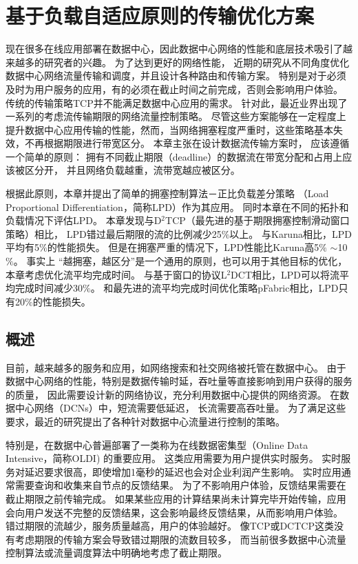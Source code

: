 \chapter{基于负载自适应原则的传输优化方案}
\label{chapter:LPD}
现在很多在线应用部署在数据中心，因此数据中心网络的性能和底层技术吸引了越来越多的研究者的兴趣。
为了达到更好的网络性能，
近期的研究从不同角度优化数据中心网络流量传输和调度，并且设计各种路由和传输方案。
特别是对于必须及时为用户服务的应用，有的必须在截止时间之前完成，否则会影响用户体验。
传统的传输策略TCP并不能满足数据中心应用的需求。
针对此，最近业界出现了一系列的考虑流传输期限的网络流量控制策略。
尽管这些方案能够在一定程度上提升数据中心应用传输的性能，然而，当网络拥塞程度严重时，这些策略基本失效，不再根据期限进行带宽区分。
本章主张在设计数据流传输方案时，
应该遵循一个简单的原则：
拥有不同截止期限（deadline）的数据流在带宽分配和占用上应该被区分开，
并且网络负载越重，流带宽越应被区分。

根据此原则，本章并提出了简单的拥塞控制算法－正比负载差分策略
（Load Proportional Differentiation，简称LPD）作为其应用。
同时本章在不同的拓扑和负载情况下评估LPD。
本章发现与D$^2$TCP（最先进的基于期限拥塞控制滑动窗口策略）相比，
LPD错过最后期限的流的比例减少25$\%$以上。
与Karuna相比，LPD平均有5$\%$的性能损失。
但是在拥塞严重的情况下，LPD性能比Karuna高5$\%$ $\sim$10$\%$。
事实上 “越拥塞，越区分”是一个通用的原则，也可以用于其他目标的优化，
本章考虑优化流平均完成时间。
与基于窗口的协议L$^2$DCT相比，LPD可以将流平均完成时间减少30$\%$。
和最先进的流平均完成时间优化策略pFabric相比，LPD只有20$\%$的性能损失。 


\section{概述}
\label{sec_LPD:Introduction}
目前，越来越多的服务和应用，如网络搜索和社交网络被托管在数据中心\cite{chowdhury2014efficient,chen2016scheduling,zhang2016fdrc,chowdhury2012coflow,chowdhury2015efficient}。
由于数据中心网络的性能，特别是数据传输时延，吞吐量等直接影响到用户获得的服务的质量，
因此需要设计新的网络协议，充分利用数据中心提供的网络资源。
在数据中心网络（DCNs）中，短流需要低延迟，
长流需要高吞吐量\cite{DCTCP,chen2016scheduling}。
为了满足这些要求，最近的研究提出了各种针对数据中心流量进行控制的策略。


特别是，在数据中心普遍部署了一类称为在线数据密集型（Online Data Intensive，简称OLDI)\cite{OLDI,D2TCP} 的重要应用。
这类应用需要为用户提供实时服务。
实时服务对延迟要求很高，即使增加1毫秒的延迟也会对企业利润产生影响\cite{Latency}。
实时应用通常需要查询和收集来自节点的反馈结果。
为了不影响用户体验，反馈结果需要在截止期限之前传输完成。
如果某些应用的计算结果尚未计算完毕开始传输，应用会向用户发送不完整的反馈结果，这会影响最终反馈结果，从而影响用户体验。
错过期限的流越少，服务质量越高，用户的体验越好。
像TCP或DCTCP这类没有考虑期限的传输方案会导致错过期限的流数目较多，
而当前很多数据中心流量控制算法\cite{D3, D2TCP}或流量调度算法\cite{PDQ}中明确地考虑了截止期限。



